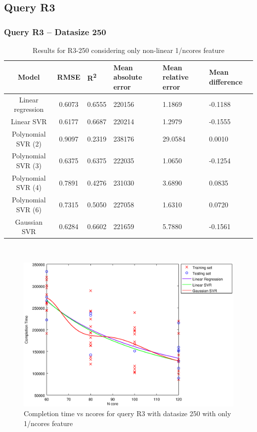 \documentclass[a4paper,11pt]{article}
\begin{document}
\newpage
\subsection{Query R3}
\subsubsection{Query R3 -- Datasize 250}
\begin{table}[H]
	\centering
	\begin{adjustbox}{center}
		\begin{tabular}{c | c M{1.2cm} M{2.5cm} M{2.5cm} M{1.8cm}}
			Model & RMSE & R\textsuperscript{2} & Mean absolute error & Mean relative error & Mean difference \tabularnewline
			\hline
			Linear regression & 0.6073 & 0.6555 & 220156 & 1.1869 & -0.1188 \\
			Linear SVR & 0.6177 & 0.6687 & 220214 & 1.2979 & -0.1555 \\
			Polynomial SVR (2) & 0.9097 & 0.2319 & 238176 & 29.0584 & 0.0010 \\
			Polynomial SVR (3) & 0.6375 & 0.6375 & 222035 & 1.0650 & -0.1254 \\
			Polynomial SVR (4) & 0.7891 & 0.4276 & 231030 & 3.6890 & 0.0835 \\
			Polynomial SVR (6) & 0.7315 & 0.5050 & 227058 & 1.6310 & 0.0720 \\
			Gaussian SVR & 0.6284 & 0.6602 & 221659 & 5.7880 & -0.1561 \\
		\end{tabular}
	\end{adjustbox}
	\\
	\caption{Results for R3-250 considering only non-linear 1/ncores feature}
	\label{table_R3_prediction_all}
\end{table}

\begin {figure}[hbtp]
\centering
\includegraphics[width=\textwidth]{output/R3_250_ONLY_1_OVER_NCORES/plot_R3_250_bestmodels.eps}
\caption {Completion time vs ncores for query R3 with datasize 250 with only 1/ncores feature}
\end {figure}
\end{document}
